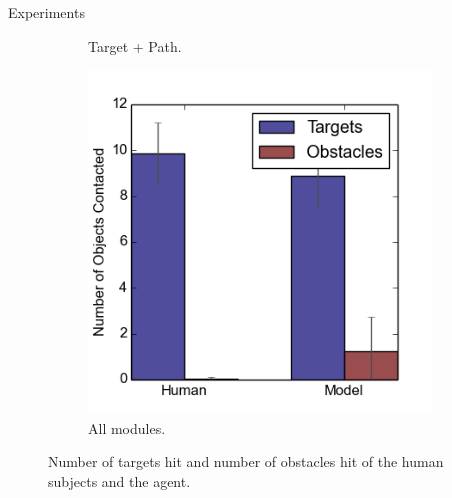 \documentclass[final]{beamer}
\begin{document}
\begin{frame}{}
\begin{textblock}{39}
\begin{block}{Experiments}
\begin{figure}[h]
\begin{subfigure}[b]{0.24\textwidth}
\caption{Target + Path.}
\end{subfigure}
\begin{subfigure}[b]{0.24\textwidth}
\includegraphics[width=\textwidth]{contact4.png}
\caption{All modules.}
\end{subfigure}
\caption{Number of targets hit and number of obstacles hit of the human subjects 
and the agent.}
\label{fig:stats}
\end{figure}


\end{block}
\end{textblock}
\end{frame}
\end{document}
